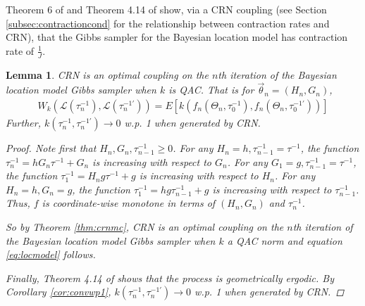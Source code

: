 \documentclass[12pt]{article}
\theoremstyle{plain}%
\newtheorem{lemma}[theorem]{Lemma}
\theoremstyle{definition}
\def\tin{\tau^{-1}}
\def\tinv{\tau^{-1}}
\begin{document}
Theorem 6 of \cite{oneshot} and Theorem 4.14 of \cite{sixta} show, via a CRN coupling (see Section \ref{subsec:contractioncond} for the relationship between contraction rates and CRN), that the Gibbs sampler for the Bayesian location model has contraction rate of $\frac{1}{J}$. 
	\begin{lemma}\label{lem:locmodel}
		CRN is an optimal coupling on the $n$th iteration of the Bayesian location model Gibbs sampler when $k$ is QAC. That is for $\vec{\theta}_n=(H_n,G_n)$,
		\begin{align}\label{eq:locmodel}
			W_{k}(\mathcal{L}(\tau^{-1}_{n}), \mathcal{L}(\tau^{-1'}_{n}))=
			E[k(f_n(\Theta_n,\tau^{-1}_{0}),f_n(\Theta_n,\tau^{-1'}_{0}) )]
		\end{align}
		Further, $k(\tinv_{n}, \tau^{-1'}_{n})\to 0$ w.p. 1 when generated by CRN.
		\begin{proof}
			Note first that $H_n, G_n,\tau_{n-1}^{-1}\geq 0$. 
			For any $H_n=h, \tau_{n-1}^{-1}=\tinv$, the function $\tinv_{n}=hG_n\tinv+G_n$ is increasing with respect to $G_n$. 
			For any $G_1=g, \tau_{n-1}^{-1}=\tinv$, the function $\tinv_{1}=H_ng\tin+g$ is increasing with respect to $H_n$. 
			For any $H_n=h, G_n=g$, the function $\tinv_{1}=hg\tin_{n-1}+g$ is increasing with respect to $\tin_{n-1}$. Thus, $f$ is coordinate-wise monotone in terms of $(H_n, G_n)$ and $\tau^{-1}_n$.
			
			So by Theorem \ref{thm:crnmc}, CRN is an optimal coupling on the $n$th iteration of the Bayesian location model Gibbs sampler when $k$ a QAC norm and equation \ref{eq:locmodel} follows.
			
			Finally, Theorem 4.14 of \cite{sixta} shows that the process is geometrically ergodic. By Corollary \ref{cor:convwp1}, $k(\tinv_{n}, \tau^{-1'}_{n})\to 0$ w.p. 1 when generated by CRN.
		\end{proof}
	\end{lemma}
\end{document}
